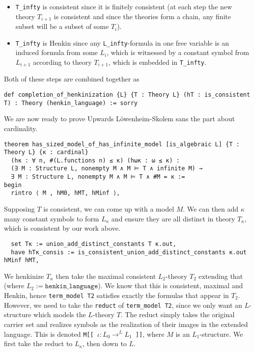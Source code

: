 \documentclass{article}
\newcommand{\<}{\langle}
\renewcommand{\>}{\rangle}
\theoremstyle{definitionstyle}
\theoremstyle{exercisestyle}
\theoremstyle{remarkstyle}
\begin{document}
\begin{itemize}
  \item
        \texttt{T\_infty} is consistent since it is finitely consistent
        (at each step the new theory $T_{i+1}$ is consistent
        and since the theories form a chain,
        any finite subset will be a subset of some $T_{i}$).
  \item
        \texttt{T\_infty} is Henkin since any \texttt{L\_infty}-formula in one free variable
        is an induced formula from some $L_{i}$, which is witnessed by a constant symbol
        from $L_{i+1}$ according to theory $T_{i+1}$, which is embedded in \texttt{T\_infty}.
\end{itemize}

Both of these steps are combined together as

\begin{lstlisting}
def completion_of_henkinization {L} {T : Theory L} (hT : is_consistent T) : Theory (henkin_language) := sorry
\end{lstlisting}

We are now ready to prove Upwards L\"{o}wenheim-Skolem
sans the part about cardinality.

\begin{lstlisting}
theorem has_sized_model_of_has_infinite_model [is_algebraic L] {T : Theory L} {κ : cardinal}
  (hκ : ∀ n, #(L.functions n) ≤ κ) (hωκ : ω ≤ κ) :
  (∃ M : Structure L, nonempty M ∧ M ⊨ T ∧ infinite M) →
  ∃ M : Structure L, nonempty M ∧ M ⊨ T ∧ #M = κ :=
begin
  rintro ⟨ M , hM0, hMT, hMinf ⟩, \end{lstlisting}

Supposing $T$ is consistent, we can come up with a model $M$.
We can then add $\kappa$ many constant symbols to form $L_\kappa$
and ensure they are all distinct in theory $T_\kappa$,
which is consistent by our work above.
\begin{lstlisting}
  set Tκ := union_add_distinct_constants T κ.out,
  have hTκ_consis := is_consistent_union_add_distinct_constants κ.out hMinf hMT, \end{lstlisting}
We henkinize $T_\kappa$ then take the maximal consistent $L_{2}$-theory $T_{2}$
extending that (where $L_{2} := \texttt{henkin\_language}$).
We know that this is consistent, maximal and Henkin,
hence \texttt{term\_model T2} satisfies exactly the formulas
that appear in $T_{2}$.
However, we need to take the \texttt{reduct} of \texttt{term\_model T2},
since we only want an $L$-structure which models the $L$-theory $T$.
The reduct simply takes the original carrier set and realizes symbols
as the realization of their images in the extended language.
This is denoted \texttt{M[[ $\iota : L_{0} \to^{L} L_{1}$ ]]}, where $M$ is
an $L_{1}$-structure.
We first take the reduct to $L_{\kappa}$, then down to $L$.
\end{document}
